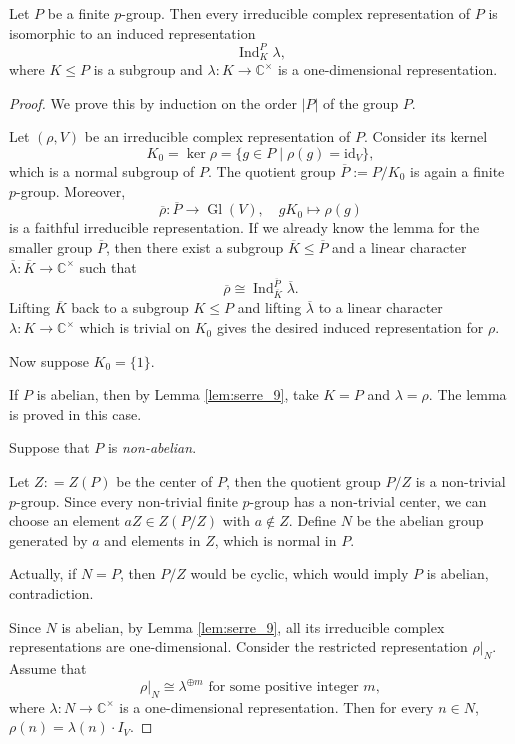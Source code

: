 \begin{lemma}\label{lem:p-group_one-dimensional induced}
Let \(P\) be a finite \(p\)-group. Then every irreducible complex representation of \(P\) is isomorphic to an induced representation
\[
\operatorname{Ind}_{K}^{P} \lambda,
\]
where \(K \le P\) is a subgroup and \(\lambda: K \to \mathbb{C}^{\times}\) is a one-dimensional representation.
\end{lemma}

\begin{proof}
We prove this by induction on the order \(|P|\) of the group \(P\).


Let \((\rho, V)\) be an irreducible complex representation of \(P\). Consider its kernel
\[
K_0 = \ker \rho = \{ g \in P \mid \rho(g) = \mathrm{id}_V \},
\]
which is a normal subgroup of \(P\). The quotient group \(\overline{P} := P/K_0\) is again a finite \(p\)-group. 
Moreover, \[\overline{\rho}:\overline{P} \to\operatorname{Gl}(V),\quad gK_0\mapsto\rho(g)\]is a faithful irreducible representation. 
If we already know the lemma for the smaller group \(\overline{P}\), then there exist a subgroup \(\overline{K} \leq \overline{P}\) and a linear character \(\overline{\lambda} : \overline{K} \to \mathbb{C}^{\times}\) such that
\[
\overline{\rho} \cong \operatorname{Ind}_{\overline{K}}^{\overline{P}} \overline{\lambda}.
\]
Lifting \(\overline{K}\) back to a subgroup \(K \leq P\) and lifting \(\overline{\lambda}\) to a linear character \(\lambda : K \to \mathbb{C}^{\times}\) which is trivial on \(K_0\) gives the desired induced representation for \(\rho\). 

Now suppose \(K_0 = \{1\}\). 


If \(P\) is abelian, then by Lemma \ref{lem:serre_9},  take \(K = P\) and \(\lambda = \rho\). The lemma is proved in this case. 

Suppose that \(P\) is \emph{non-abelian}.



Let \(Z: = Z(P)\) be the center of \(P\), then the quotient group \(P/Z\) is a non-trivial \(p\)-group. Since every non-trivial finite \(p\)-group has a non-trivial center, we can choose an element \(aZ \in Z(P/Z)\) with \(a \notin Z\).
Define $N$ be the abelian group generated by $a$ and elements in $Z$, which is normal in \(P\). 


Actually, if \(N = P\), then \(P/Z\) would be cyclic, which would imply \(P\) is abelian, contradiction. 


Since \(N\) is abelian, by Lemma \ref{lem:serre_9}, all its irreducible complex representations are one-dimensional. Consider the restricted representation \(\rho|_N\). 
Assume that 
\[
\rho|_N \cong \lambda^{\oplus m} \text{  for some positive integer }m,
\]
where \(\lambda : N \to \mathbb{C}^{\times}\) is a one-dimensional representation. Then for every \(n \in N\), \(\rho(n) = \lambda(n) \cdot I_V\).


\end{proof}
